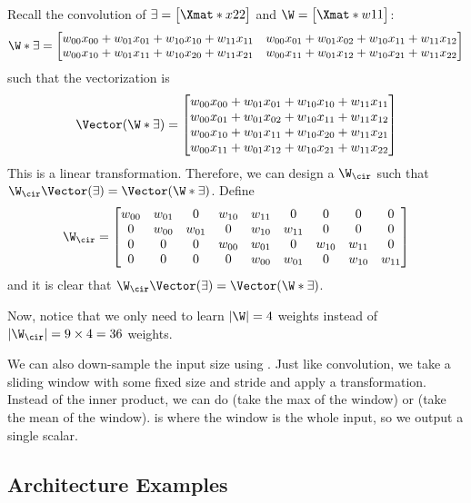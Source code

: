 \documentclass[class=cs480,notes,tikz]{agony}
\begin{document}
Recall the convolution of $\X = \mqty[\Xmat*{x}{2}{2}]$
and $\W = \mqty[\Xmat*{w}{1}{1}]$:
\[
  \W \ast \X = \begin{bmatrix}
    w_{00}x_{00} + w_{01}x_{01} + w_{10}x_{10} + w_{11}x_{11}
     & w_{00}x_{01} + w_{01}x_{02} + w_{10}x_{11} + w_{11}x_{12} \\
    w_{00}x_{10} + w_{01}x_{11} + w_{10}x_{20} + w_{11}x_{21}
     & w_{00}x_{11} + w_{01}x_{12} + w_{10}x_{21} + w_{11}x_{22}
  \end{bmatrix}
\]
such that the vectorization is
\[
  \Vector(\W \ast \X) = \mqty[
  w_{00}x_{00} + w_{01}x_{01} + w_{10}x_{10} + w_{11}x_{11} \\
  w_{00}x_{01} + w_{01}x_{02} + w_{10}x_{11} + w_{11}x_{12} \\
  w_{00}x_{10} + w_{01}x_{11} + w_{10}x_{20} + w_{11}x_{21} \\
  w_{00}x_{11} + w_{01}x_{12} + w_{10}x_{21} + w_{11}x_{22}
  ]
\]
This is a linear transformation.
Therefore, we can design a  $\W_\cir$
such that $\W_\cir\Vector(\X) = \Vector(\W \ast \X)$. Define
\[
  \W_\cir = \begin{bmatrix}
    w_{00} & w_{01} & 0      & w_{10} & w_{11} & 0      & 0      & 0      & 0      \\
    0      & w_{00} & w_{01} & 0      & w_{10} & w_{11} & 0      & 0      & 0      \\
    0      & 0      & 0      & w_{00} & w_{01} & 0      & w_{10} & w_{11} & 0      \\
    0      & 0      & 0      & 0      & w_{00} & w_{01} & 0      & w_{10} & w_{11}
  \end{bmatrix}
\]
and it is clear that $\W_\cir\Vector(\X) = \Vector(\W\ast\X)$.

Now, notice that we only need to learn $\abs{\W} = 4$ weights
instead of $\abs{\W_\cir} = 9 \times 4 = 36$ weights.

We can also down-sample the input size using .
Just like convolution, we take a sliding window with some fixed size and stride
and apply a transformation.
Instead of the inner product, we can do 
(take the max of the window) or 
(take the mean of the window).
 is where the window is the whole input,
so we output a single scalar.

\subsection*{Architecture Examples}
\end{document}
